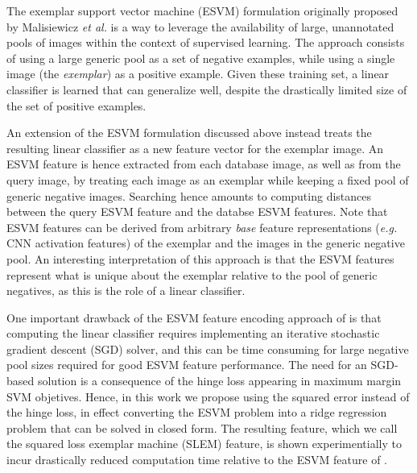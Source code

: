 The exemplar support vector machine (ESVM) formulation originally proposed by Malisiewicz {\it et al.} \cite{Malisiewicza} is a way to leverage the availability of large, unannotated pools of images within the context of supervised learning. The approach consists of using a large generic pool as a set of negative examples, while using a single image (the \emph{exemplar}) as a positive example. Given these training set, a linear classifier is learned that can  generalize well, despite the drastically limited size of the set of positive examples. 

An extension \cite{ZePe15} of the ESVM formulation discussed above instead treats the resulting linear classifier as a new feature vector for the exemplar image. %
An ESVM feature is hence extracted from each database image, as well as from the query image, by treating each image as an exemplar while keeping a fixed pool of generic negative images. Searching hence amounts to computing distances between the query ESVM feature and the databse ESVM features. Note that ESVM features can be derived from arbitrary \emph{base} feature representations ({\it e.g.} CNN activation features) of the exemplar and the images in the generic negative pool. An interesting interpretation of this approach is that the ESVM features represent what is unique about the exemplar relative to the pool of generic negatives, as this is the role of a linear classifier.

One important drawback of the ESVM feature encoding approach of \cite{ZePe15} is that computing the linear classifier requires implementing an iterative stochastic gradient descent (SGD) solver, and this can be time consuming for large negative pool sizes required for good ESVM feature performance. The need for an SGD-based solution is a consequence of the hinge loss appearing in maximum margin SVM objetives. Hence, in this work we  propose using the squared error instead of the hinge loss, in effect converting the ESVM problem into a ridge regression problem that can be solved in closed form. The resulting feature, which we call the squared loss exemplar machine (SLEM) feature, is shown experimentially to incur drastically reduced computation time relative to the ESVM feature of \cite{ZePe15}. 

